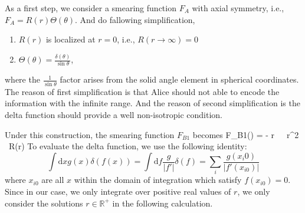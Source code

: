 \documentclass[a4paper,12pt]{article}
\begin{document}
As a first step, we consider a smearing function $F_A$ with axial symmetry, i.e., $F_A = R(r)\Theta(\theta)$.
And do fallowing simplification, 
\begin{enumerate}
  \item $R(r)$ is localized at $r = 0$, i.e., $R(r \rightarrow \infty) = 0$
  \item $\Theta(\theta) = \frac{\delta(\theta)}{\sin{\theta}}$,
\end{enumerate}
where the $\frac{1}{\sin\theta}$ factor arises from the solid angle element in spherical coordinates.
The reason of first simplification is that Alice should not able to encode the information with the infinite range. And the reason of second simplification is the delta function should provide a well non-isotropic condition.

Under this construction, the smearing function $F_{B1}$ becomes
\be
    F_{B1}() = - \int {}r\, \theta\, \phi\, r^2 \sin{\theta} \, R(r)\frac{\delta(\theta)}{\sin{\theta}} 
\ee
To evaluate the delta function, we use the following identity:
\[
    \int \mathrm{d}x g(x) \delta(f(x)) = \int \mathrm{d}f \frac{g}{\left|f'\right|} \delta(f) = \sum_i\frac{g(x_i0)}{\left|f'(x_{i0})\right|}
\]
where $x_{i0}$ are all $x$ within the domain of integration which satisfy $f(x_{i0}) = 0$. Since in our case, we only integrate over positive real values of $r$, we only consider the solutions $r \in \mathbb{R}^+$ in the following calculation.
\end{document}
